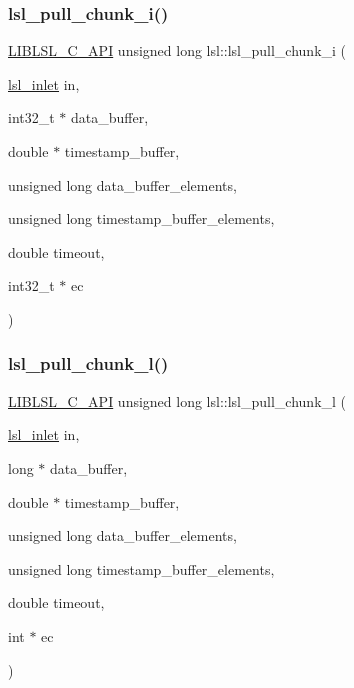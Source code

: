 \subsubsection{\texorpdfstring{lsl\+\_\+pull\+\_\+chunk\+\_\+i()}{lsl\_pull\_chunk\_i()}}
{\footnotesize\ttfamily \hyperlink{lsl__cpp_8h_aafd0ef1813e8be84a1420c4f1df64615}{L\+I\+B\+L\+S\+L\+\_\+\+C\+\_\+\+A\+PI} unsigned long lsl\+::lsl\+\_\+pull\+\_\+chunk\+\_\+i (\begin{DoxyParamCaption}\item[{\hyperlink{namespacelsl_a884a3363cfcba75d7ce8f00c1c4c54f1}{lsl\+\_\+inlet}}]{in,  }\item[{int32\+\_\+t $\ast$}]{data\+\_\+buffer,  }\item[{double $\ast$}]{timestamp\+\_\+buffer,  }\item[{unsigned long}]{data\+\_\+buffer\+\_\+elements,  }\item[{unsigned long}]{timestamp\+\_\+buffer\+\_\+elements,  }\item[{double}]{timeout,  }\item[{int32\+\_\+t $\ast$}]{ec }\end{DoxyParamCaption})}

\mbox{\label{namespacelsl_a1f78178ddd5cb824e36d4322677bbfe9}} 
\subsubsection{\texorpdfstring{lsl\+\_\+pull\+\_\+chunk\+\_\+l()}{lsl\_pull\_chunk\_l()}}
{\footnotesize\ttfamily \hyperlink{lsl__cpp_8h_aafd0ef1813e8be84a1420c4f1df64615}{L\+I\+B\+L\+S\+L\+\_\+\+C\+\_\+\+A\+PI} unsigned long lsl\+::lsl\+\_\+pull\+\_\+chunk\+\_\+l (\begin{DoxyParamCaption}\item[{\hyperlink{namespacelsl_a884a3363cfcba75d7ce8f00c1c4c54f1}{lsl\+\_\+inlet}}]{in,  }\item[{long $\ast$}]{data\+\_\+buffer,  }\item[{double $\ast$}]{timestamp\+\_\+buffer,  }\item[{unsigned long}]{data\+\_\+buffer\+\_\+elements,  }\item[{unsigned long}]{timestamp\+\_\+buffer\+\_\+elements,  }\item[{double}]{timeout,  }\item[{int $\ast$}]{ec }\end{DoxyParamCaption})}

